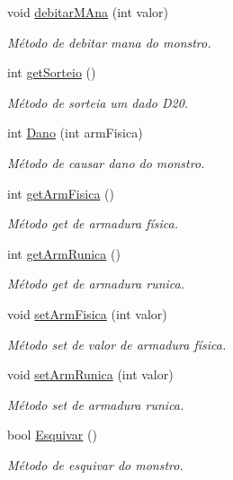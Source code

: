 \begin{DoxyCompactItemize}
void \mbox{\hyperlink{classmonstro_a1dfc486d9da7e45f0afc2da3aebfe4f8}{debitar\+M\+Ana}} (int valor)
\begin{DoxyCompactList}\small\item\em Método de debitar mana do monstro. \end{DoxyCompactList}\item 
int \mbox{\hyperlink{classmonstro_ab7a3d4c7f9ca3e5f56e27c5a1716d70f}{get\+Sorteio}} ()
\begin{DoxyCompactList}\small\item\em Método de sorteia um dado D20. \end{DoxyCompactList}\item 
int \mbox{\hyperlink{classmonstro_ad13bd91217c356e1e4ef3e50ee4160aa}{Dano}} (int arm\+Fisica)
\begin{DoxyCompactList}\small\item\em Método de causar dano do monstro. \end{DoxyCompactList}\item 
int \mbox{\hyperlink{classmonstro_adc603e8df99ff928bdb1ffc1a95f604f}{get\+Arm\+Fisica}} ()
\begin{DoxyCompactList}\small\item\em Método get de armadura física. \end{DoxyCompactList}\item 
int \mbox{\hyperlink{classmonstro_abc73db4e55eb8c72aa433d4da43bd997}{get\+Arm\+Runica}} ()
\begin{DoxyCompactList}\small\item\em Método get de armadura runica. \end{DoxyCompactList}\item 
void \mbox{\hyperlink{classmonstro_a5935667552ab7ec9ccd94e4632ecb428}{set\+Arm\+Fisica}} (int valor)
\begin{DoxyCompactList}\small\item\em Método set de valor de armadura física. \end{DoxyCompactList}\item 
void \mbox{\hyperlink{classmonstro_a81c11a61a2dc1dc6536b3c3a75947060}{set\+Arm\+Runica}} (int valor)
\begin{DoxyCompactList}\small\item\em Método set de armadura runica. \end{DoxyCompactList}\item 
bool \mbox{\hyperlink{classmonstro_a256135af5123c6927214fd6ed6d72270}{Esquivar}} ()
\begin{DoxyCompactList}\small\item\em Método de esquivar do monstro. \end{DoxyCompactList}\end{DoxyCompactItemize}


